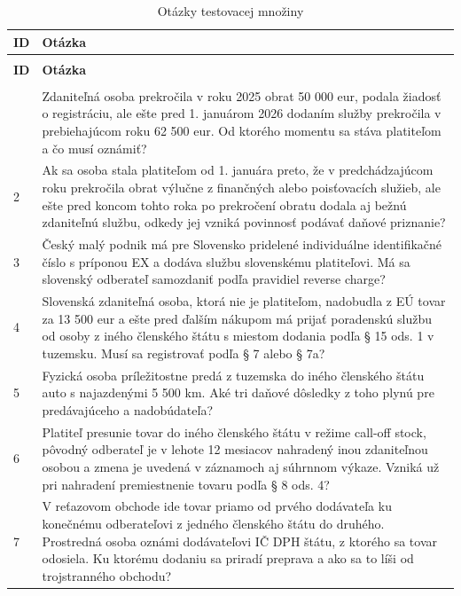 \begingroup
\small
\setlength{\tabcolsep}{5pt}
\renewcommand{\arraystretch}{1.18}
\begin{longtable}{p{}p{}}
\caption[Otázky testovacej množiny]{Otázky testovacej množiny použité pri porovnaní prístupov.}
\label{tab:rag-test-questions}\\
\hline
\textbf{ID} & \textbf{Otázka} \\
\hline
\endfirsthead
\caption[]{Otázky testovacej množiny}\\
\hline
\textbf{ID} & \textbf{Otázka} \\
\hline
\endhead
\hline
\multicolumn{2}{r}{}\\
\endfoot
\hline
\endlastfoot
1 & Zdaniteľná osoba prekročila v roku 2025 obrat 50 000 eur, podala žiadosť o registráciu, ale ešte pred 1. januárom 2026 dodaním služby prekročila v prebiehajúcom roku 62 500 eur. Od ktorého momentu sa stáva platiteľom a čo musí oznámiť? \\
2 & Ak sa osoba stala platiteľom od 1. januára preto, že v predchádzajúcom roku prekročila obrat výlučne z finančných alebo poisťovacích služieb, ale ešte pred koncom tohto roka po prekročení obratu dodala aj bežnú zdaniteľnú službu, odkedy jej vzniká povinnosť podávať daňové priznanie? \\
3 & Český malý podnik má pre Slovensko pridelené individuálne identifikačné číslo s príponou EX a dodáva službu slovenskému platiteľovi. Má sa slovenský odberateľ samozdaniť podľa pravidiel reverse charge? \\
4 & Slovenská zdaniteľná osoba, ktorá nie je platiteľom, nadobudla z EÚ tovar za 13 500 eur a ešte pred ďalším nákupom má prijať poradenskú službu od osoby z iného členského štátu s miestom dodania podľa § 15 ods. 1 v tuzemsku. Musí sa registrovať podľa § 7 alebo § 7a? \\
5 & Fyzická osoba príležitostne predá z tuzemska do iného členského štátu auto s najazdenými 5 500 km. Aké tri daňové dôsledky z toho plynú pre predávajúceho a nadobúdateľa? \\
6 & Platiteľ presunie tovar do iného členského štátu v režime call-off stock, pôvodný odberateľ je v lehote 12 mesiacov nahradený inou zdaniteľnou osobou a zmena je uvedená v záznamoch aj súhrnnom výkaze. Vzniká už pri nahradení premiestnenie tovaru podľa § 8 ods. 4? \\
7 & V reťazovom obchode ide tovar priamo od prvého dodávateľa ku konečnému odberateľovi z jedného členského štátu do druhého. Prostredná osoba oznámi dodávateľovi IČ DPH štátu, z ktorého sa tovar odosiela. Ku ktorému dodaniu sa priradí preprava a ako sa to líši od trojstranného obchodu? \\

\end{longtable}
